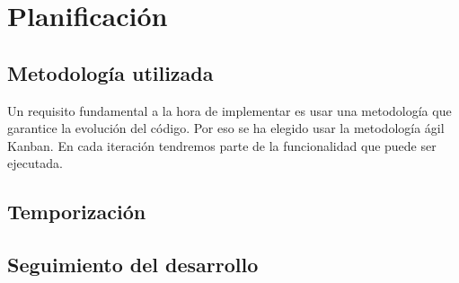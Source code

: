 \chapter{Planificación}

\section{Metodología utilizada}

Un requisito fundamental a la hora de implementar es usar una metodología que garantice la evolución del código. Por eso se ha
elegido usar la metodología ágil Kanban. En cada iteración tendremos parte de la funcionalidad que puede ser ejecutada.

\section{Temporización}

\section{Seguimiento del desarrollo}
